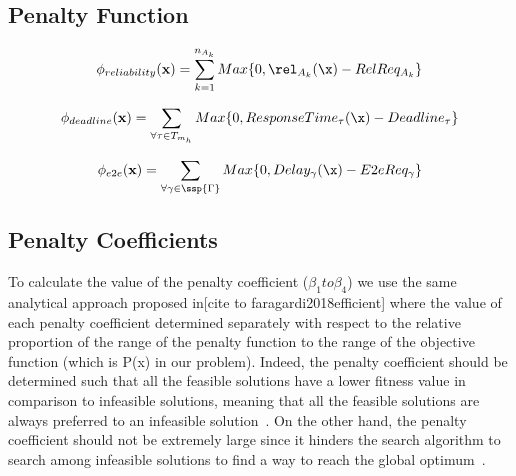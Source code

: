 \subsection{Penalty Function}
\label{sec:penaltyfunction}

\begin{equation}
\label{}
    \phi_{reliability}(\textbf{x}) = \sum_{k=1}^{n_{A_k}}{Max \{0, \rel_{A_k}(\x) - RelReq_{A_k} \}}
\end{equation}

\begin{equation}
\label{}
    \phi_{deadline}(\textbf{x}) = \sum_{\forall \tau\in T_{m_h}}{Max \{0, ResponseTime_{\tau}(\x) - Deadline_{\tau} \}}
\end{equation}

\begin{equation}
\label{}
    \phi_{e2e}(\textbf{x}) = \sum_{\forall \gamma \in \ssp{\Gamma}}{Max \{0, Delay_\gamma(\x) - E2eReq_\gamma \}}
\end{equation}

\subsection{Penalty Coefficients}
\label{sec:penaltycoefficient}
To calculate the value of the penalty coefficient ($\beta_1 to \beta_4$) we use the same analytical approach proposed in[cite to faragardi2018efficient]
where the value of each penalty coefficient determined separately with respect to the relative proportion of the range of the penalty function to the range of the objective function (which is P(x) in our problem). Indeed, the penalty coefficient should be determined such that all the feasible solutions have a lower fitness value in comparison to infeasible solutions, meaning that all the feasible solutions are always preferred to an infeasible solution~\cite{faragardi2018JSS}. On the other hand, the penalty coefficient should not be extremely large since it hinders the search algorithm to search among infeasible solutions to find a way to reach the global optimum~\cite{talbi2009metaheuristics}.


